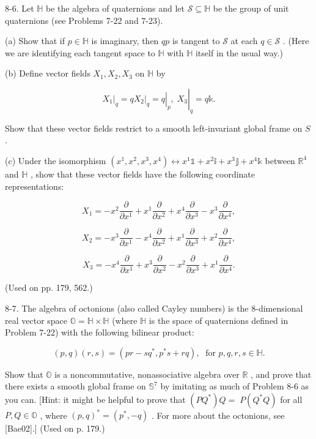 \begin{exercise}
\label{prob:8-6}
\leanok
{}
8-6. Let $\mathbb{H}$ be the algebra of quaternions and let $\mathcal{S} \subseteq  \mathbb{H}$ be the group of unit quaternions (see Problems 7-22 and 7-23).

(a) Show that if $p \in  \mathbb{H}$ is imaginary, then ${qp}$ is tangent to $\mathcal{S}$ at each $q \in  \mathcal{S}$ . (Here we are identifying each tangent space to $\mathbb{H}$ with $\mathbb{H}$ itself in the usual way.)

(b) Define vector fields ${X}_{1},{X}_{2},{X}_{3}$ on $\mathbb{H}$ by

\[
{\left. {X}_{1}\right| }_{q} = q{\left. {\left. {\left. {X}_{2}\right| }_{q} = q\right| }_{p},\;{X}_{3}\right| }_{q} = q\mathbb{k}.
\]

Show that these vector fields restrict to a smooth left-invariant global frame on $S$ .

(c) Under the isomorphism $\left( {{x}^{1},{x}^{2},{x}^{3},{x}^{4}}\right)  \leftrightarrow  {x}^{1}\mathbb{1} + {x}^{2}\mathbb{i} + {x}^{3}\mathbb{j} + {x}^{4}\mathbb{k}$ between ${\mathbb{R}}^{4}$ and $\mathbb{H}$ , show that these vector fields have the following coordinate representations:

\[
{X}_{1} =  - {x}^{2}\frac{\partial }{\partial {x}^{1}} + {x}^{1}\frac{\partial }{\partial {x}^{2}} + {x}^{4}\frac{\partial }{\partial {x}^{3}} - {x}^{3}\frac{\partial }{\partial {x}^{4}},
\]

\[
{X}_{2} =  - {x}^{3}\frac{\partial }{\partial {x}^{1}} - {x}^{4}\frac{\partial }{\partial {x}^{2}} + {x}^{1}\frac{\partial }{\partial {x}^{3}} + {x}^{2}\frac{\partial }{\partial {x}^{4}},
\]

\[
{X}_{3} =  - {x}^{4}\frac{\partial }{\partial {x}^{1}} + {x}^{3}\frac{\partial }{\partial {x}^{2}} - {x}^{2}\frac{\partial }{\partial {x}^{3}} + {x}^{1}\frac{\partial }{\partial {x}^{4}}.
\]

(Used on pp. 179, 562.)
\end{exercise}

\begin{exercise}
\label{prob:8-7}
\leanok
{}
8-7. The algebra of octonions (also called Cayley numbers) is the 8-dimensional real vector space $\mathbb{O} = \mathbb{H} \times  \mathbb{H}$ (where $\mathbb{H}$ is the space of quaternions defined in Problem 7-22) with the following bilinear product:

\[
\left( {p, q}\right) \left( {r, s}\right)  = \left( {{pr} - s{q}^{ * },{p}^{ * }s + {rq}}\right) ,\;\text{ for }p, q, r, s \in  \mathbb{H}. \tag{8.20}
\]

Show that $\mathbb{O}$ is a noncommutative, nonassociative algebra over $\mathbb{R}$ , and prove that there exists a smooth global frame on ${\mathbb{S}}^{7}$ by imitating as much of Problem 8-6 as you can. [Hint: it might be helpful to prove that $\left( {P{Q}^{ * }}\right) Q = \; P\left( {{Q}^{ * }Q}\right)$ for all $P, Q \in  \mathbb{O}$ , where ${\left( p, q\right) }^{ * } = \left( {{p}^{ * }, - q}\right)$ . For more about the octonions, see [Bae02].] (Used on p. 179.)
\end{exercise}

